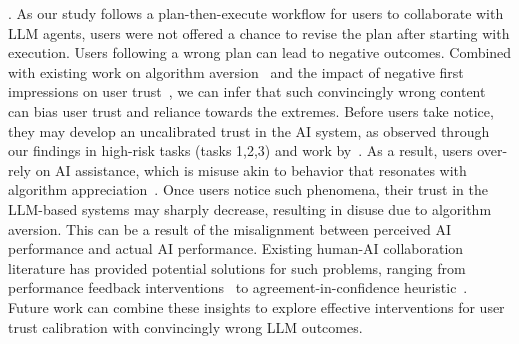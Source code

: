 . 
As our study follows a plan-then-execute workflow for users to collaborate with LLM agents, users were not offered a chance to revise the plan after starting with execution. 
Users following a wrong plan can lead to negative outcomes. %
Combined with existing work on algorithm aversion~\cite{dietvorst2015algorithm} and the impact of negative first impressions on user trust~\cite{tolmeijer2021second}, we can infer that such convincingly wrong content~\cite{si2024large} can bias user trust and reliance towards the %
extremes. 
Before users take notice, they may develop an uncalibrated trust in the AI system, as observed through our findings in high-risk tasks (\ie tasks 1,2,3) and  work by~\citet{si2024large}. 
As a result, users over-rely on AI assistance, which is misuse akin to behavior that resonates with algorithm appreciation~\cite{logg2019algorithm}. 
Once users notice such phenomena, their trust in the LLM-based systems may sharply decrease, resulting in disuse due to algorithm aversion. 
{This can be a result of the misalignment between perceived AI performance and actual AI performance.
Existing human-AI collaboration literature has provided potential solutions for such problems, ranging from performance feedback interventions~\cite{he2023knowing} to agreement-in-confidence heuristic~\cite{Lu-CHI-2021,pescetelli2021role}.
} 
Future work can combine these insights to explore effective interventions for user trust calibration with convincingly wrong LLM outcomes.

